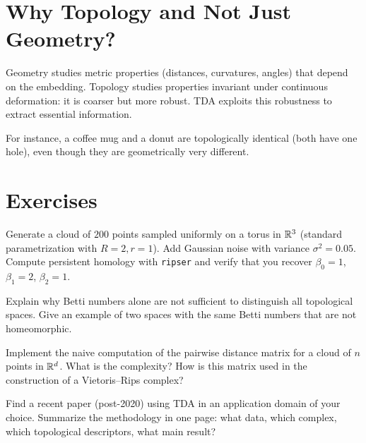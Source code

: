 \section{Why Topology and Not Just Geometry?}

\begin{remark}
Geometry studies metric properties (distances, curvatures, angles) that
depend on the embedding. Topology studies properties invariant under
continuous deformation: it is coarser but more robust. TDA exploits
this robustness to extract essential information.

For instance, a coffee mug and a donut are topologically identical
(both have one hole), even though they are geometrically very different.
\end{remark}

\section{Exercises}

\begin{exercise}
Generate a cloud of $200$ points sampled uniformly on a torus in $\mathbb{R}^3$
(standard parametrization with $R=2, r=1$). Add Gaussian noise with
variance $\sigma^2 = 0.05$. Compute persistent homology with
\texttt{ripser} and verify that you recover $\beta_0 = 1$,
$\beta_1 = 2$, $\beta_2 = 1$.
\end{exercise}

\begin{exercise}
Explain why Betti numbers alone are not sufficient to distinguish all
topological spaces. Give an example of two spaces with the same Betti
numbers that are not homeomorphic.
\end{exercise}

\begin{exercise}
Implement the naive computation of the pairwise distance matrix for a
cloud of $n$ points in $\mathbb{R}^d$. What is the complexity? How is this
matrix used in the construction of a Vietoris--Rips complex?
\end{exercise}

\begin{exercise}
Find a recent paper (post-2020) using TDA in an application domain of
your choice. Summarize the methodology in one page: what data, which
complex, which topological descriptors, what main result?
\end{exercise}
